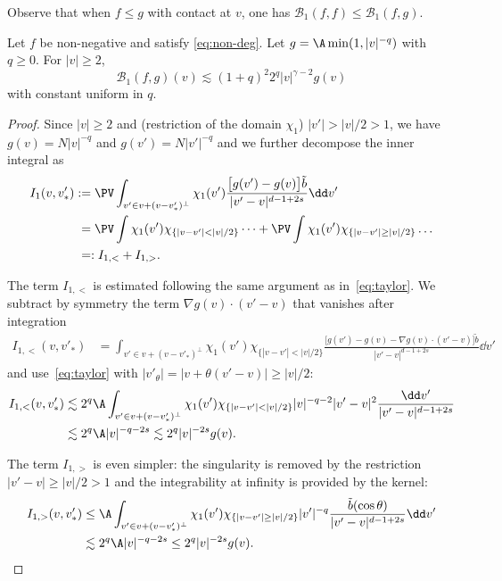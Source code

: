 Observe that when $f \le g$ with contact at $v$, one has
$\mathcal{B}_1(f,f) \le \mathcal{B}_1(f,g)$.
\begin{prop} \label{prop:B1} Let $f$ be non-negative and satisfy \eqref{eq:non-deg}. Let
$g = \A \min(1,|v|^{-q})$ with $q \ge 0$. For $|v| \ge 2$,
\[ \mathcal{B}_1 (f,g)(v) \lesssim (1+q)^2 2^q |v|^{\gamma -2} g(v)\]
with constant uniform in $q$.
\end{prop}

\begin{proof}
Since $|v|\ge 2$ and (restriction of the domain $\chi_1$)
$|v'| > |v|/2 >1$, we have $g(v) = N |v|^{-q}$ and
$g(v') = N |v'|^{-q}$ and we further decompose the inner integral as
\begin{align*}
I_1(v,v'_*) &:= \PV \int_{v' \in v + (v-v'_*)^\bot} \chi_1
(v') \frac{\big[
g(v')-g(v) \big] \tilde b}{|v'-v|^{d-1+2s}} \dd v' \\
&\phantom{:}= \PV \int \chi_1(v')
\chi_{\{|v-v'| < |v|/2\}} \dots + \PV \int \chi_1(v')
\chi_{\{|v-v'| \ge |v|/2\}} \dots \\
&\phantom{:}=: I_{1,<} + I_{1,>}.
\end{align*}

The term $I_{1,<}$ is estimated following the same argument as
in~\eqref{eq:taylor}. We subtract by symmetry the term
$\nabla g(v) \cdot (v'-v)$ that vanishes after integration
\begin{align*}
I_{1,<}(v,v'_*) & = \int_{v' \in v + (v-v'_*)^\bot} \chi_1
(v') \chi_{\{|v-v'| < |v|/2\}} \frac{\big[ g(v')-g(v) - \nabla g (v) \cdot (v'-v) \big]
\tilde b}{|v'-v|^{d-1+2s}} \dd v'
\end{align*}
and use~\eqref{eq:taylor} with $|v'_\theta| = |v+\theta (v'-v)| \ge |v|/2$:
\begin{align*}
I_{1,<}(v,v'_*) & \lesssim 2^q \A \int_{v' \in v + (v-v'_*)^\bot}
\chi_1(v') \chi_{\{|v-v'| < |v|/2\}} |v|^{-q-2} |v'-v|^2 \frac{\dd v'}{|v'-v|^{d-1+2s}}\\
& \lesssim 2^q \A |v|^{-q-2s} \lesssim 2^q |v|^{-2s} g(v).
\end{align*}

The term $I_{1,>}$ is even simpler: the singularity is removed by the
restriction $|v'-v| \ge |v|/2 >1$ and the integrability at infinity is
provided by the kernel:
\begin{align*}
I_{1,>}(v,v'_*) & \le \A \int_{v' \in v + (v-v'_*)^\bot} \chi_1(v') \chi_{\{|v-v'| \ge |v|/2\}}
|v'|^{-q} \frac{\tilde b(\cos \theta)}{|v'-v|^{d-1+2s}}
\dd v'\\
& \lesssim 2^q \A |v|^{-q-2s} \le 2^q |v|^{-2s} g(v).
\end{align*}


\end{proof}
